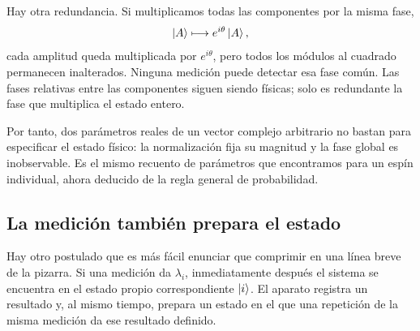 \begin{classroomqa}\end{classroomqa}

Hay otra redundancia. Si multiplicamos todas las componentes por la misma fase,
\begin{equation}
\left\lvert A\right\rangle\longmapsto e^{i\theta}\left\lvert A\right\rangle,
\label{eq:l3-global-phase}
\end{equation}
cada amplitud queda multiplicada por \(e^{i\theta}\), pero todos los módulos al cuadrado permanecen inalterados. Ninguna medición puede detectar esa fase común. Las fases relativas entre las componentes siguen siendo físicas; solo es redundante la fase que multiplica el estado entero.

Por tanto, dos parámetros reales de un vector complejo arbitrario no bastan para especificar el estado físico: la normalización fija su magnitud y la fase global es inobservable. Es el mismo recuento de parámetros que encontramos para un espín individual, ahora deducido de la regla general de probabilidad.

\subsection{La medición también prepara el estado}

Hay otro postulado que es más fácil enunciar que comprimir en una línea breve de la pizarra. Si una medición da \(\lambda_i\), inmediatamente después el sistema se encuentra en el estado propio correspondiente \(\left\lvert i\right\rangle\). El aparato registra un resultado y, al mismo tiempo, prepara un estado en el que una repetición de la misma medición da ese resultado definido.

\begin{classroomqa}\end{classroomqa}

